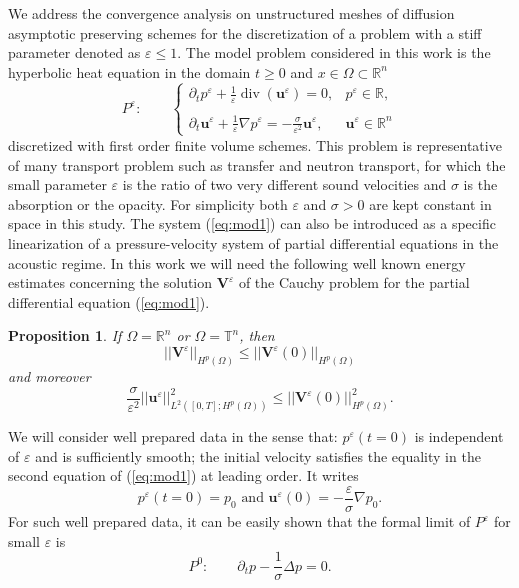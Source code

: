 \documentclass[a4paper,french,english,10pt]{article}
\newcommand\uu{\mathbf{u}}
\newcommand\eps{\varepsilon}
\newcommand{\ds}{\displaystyle}
\newcommand\V{\mathbf{V}}
\newtheorem{proposition}[theorem]{Proposition}
\begin{document}
We address the convergence analysis  on unstructured meshes
of diffusion
asymptotic preserving schemes for the discretization
of a problem with a stiff parameter denoted as $\eps\leq 1$.
The model problem considered in this work
is  the hyperbolic heat equation in the domain 
$t\geq 0$ and  $x\in \Omega\subset \mathbb R^n$
\begin{equation} \label{eq:mod1}
P^\varepsilon: \qquad 
\left\{\begin{array}{ll}
\ds\partial_t p^{\eps}+\frac{1}{\eps}\operatorname{div}(\uu^{\eps})=0,
& p^{\eps}\in \mathbb R, \\
\\
\ds\partial_t \uu^{\eps}+\frac{1}{\eps}\nabla
p^{\eps}=-\frac{\sigma}{\eps^2}\uu^{\eps},
& \uu^{\eps}  \in \mathbb R^n
 \end{array}\right.
\end{equation}
discretized with first order finite volume schemes.
This problem is representative
of many  transport problem such
as transfer and neutron transport,  for which the small parameter
$\eps$ is the ratio of two very different sound velocities and
$\sigma$ is the absorption or the opacity.
For simplicity both $\eps$ and  $\sigma>0$ are kept constant in space in this study.
The system (\ref{eq:mod1}) can also be introduced as a specific linearization
of a pressure-velocity system of partial differential equations
in the acoustic regime. In this work we will need the following well known energy estimates concerning 
the solution $\V^\eps$ of the Cauchy problem for the partial differential equation (\ref{eq:mod1}).


\begin{proposition}\label{bee}
If $\Omega= \mathbb R^n$ or $\Omega= \mathbb T^n$, then
\begin{equation}\label{bee1}
\vert\vert \V^\varepsilon \vert \vert_{H^p( \Omega)}\leq \vert\vert \V^\varepsilon(0) \vert \vert_{H^p( \Omega)}
\end{equation}
 and moreover 
\begin{equation}\label{bee2}
\frac{\sigma}{\eps^2}\vert\vert \uu^\varepsilon \vert \vert^2_{L^2([0,T];H^p( \Omega))}\leq \vert\vert \V^\varepsilon(0) \vert \vert^2_{H^p( \Omega)}.
\end{equation}
\end{proposition}

We will consider well prepared data in the sense that:
 $p^\eps(t=0)$
is independent of $\eps$ and is sufficiently smooth;
the initial velocity satisfies the equality in the second equation
of (\ref{eq:mod1}) at leading order. It writes 
\begin{equation} \label{eq:iniwp}
p^\eps(t=0)=p_0 \mbox{ and } 
\mathbf u^\eps(0)=-\frac\eps\sigma \nabla p_0.
\end{equation}
For such well prepared data, it can be easily shown that
the formal limit of $P^\varepsilon$ for small $\eps$ is
\begin{equation} \label{eq:mod2}
P^0: \qquad
\partial_t p - \frac1\sigma \Delta p=0. 
\end{equation}
\end{document}
